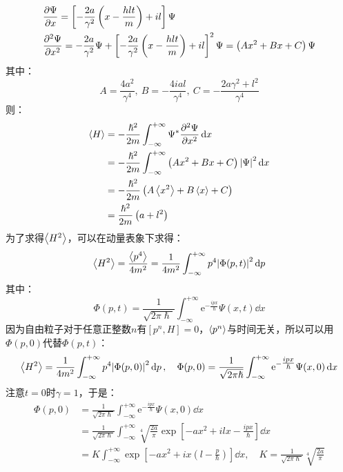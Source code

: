 \documentclass[a4paper,fontset=none]{ctexart}
\renewcommand\hbar\hslash
\begin{document}
\begin{itemize}
        \begin{align*}
            & \pdv{\Psi}{x}
            = \left[-\frac{2a}{\gamma^2}\left(x - \frac{hlt}{m}\right) + il\right]\Psi \\
            & \pdv[2]{\Psi}{x}
            = -\frac{2a}{\gamma^2}\Psi + \left[-\frac{2a}{\gamma^2}\left(x - \frac{hlt}{m}\right) + il\right]^2\Psi
            = \left(Ax^2 + Bx + C\right)\Psi
        \end{align*}
        其中：
        \[
            A = \frac{4a^2}{\gamma^4},\ B = -\frac{4ial}{\gamma^4},\ C = -\frac{2a\gamma^2 + l^2}{\gamma^4}
        \]
        则：
        \begin{align*}
            \expval{H}
            &= -\frac{\hbar^2}{2m} \int_{-\infty}^{+\infty} \Psi^* \pdv[2]{\Psi}{x} \dd{x} \\
            &= -\frac{\hbar^2}{2m} \int_{-\infty}^{+\infty} \left(Ax^2 + Bx + C\right)\abs{\Psi}^2 \dd{x} \\
            &= -\frac{\hbar^2}{2m} \left(A\expval{x^2} + B\expval{x} + C\right) \\
            &= \frac{\hbar^2}{2m} \left(a + l^2\right)
        \end{align*}
        为了求得$\expval{H^2}$，可以在动量表象下求得：
        \[
            \expval{H^2} = \frac{\expval{p^4}}{4m^2} = \frac{1}{4m^2} \int_{-\infty}^{+\infty} p^4 \abs{\Phi(p,t)}^2 \dd{p}
        \]
        其中：
        \[
            \Phi(p,t) = \frac{1}{\sqrt{2\pi\hbar}} \int_{-\infty}^{+\infty} \mathrm{e}^{-\tfrac{ipx}{\hbar}} \Psi(x,t) \dd{x}
        \]
        因为自由粒子对于任意正整数$n$有$[p^n, H] = 0$，$\expval{p^n}$与时间无关，所以可以用$\Phi(p,0)$代替$\Phi(p,t)$：
        \[
            \expval{H^2} = \frac{1}{4m^2} \int_{-\infty}^{+\infty} p^4 \abs{\Phi(p,0)}^2 \dd{p},\quad
            \Phi(p,0) = \frac{1}{\sqrt{2\pi\hbar}} \int_{-\infty}^{+\infty} \mathrm{e}^{-\tfrac{ipx}{\hbar}} \Psi(x,0) \dd{x}
        \]
        注意$t = 0$时$\gamma = 1$，于是：
        \begin{align*}
            \Phi(p,0)
            &= \frac{1}{\sqrt{2\pi\hbar}} \int_{-\infty}^{+\infty} \mathrm{e}^{-\tfrac{ipx}{\hbar}} \Psi(x,0) \dd{x} \\
            &= \frac{1}{\sqrt{2\pi\hbar}} \int_{-\infty}^{+\infty} \sqrt[4]{\frac{2a}{\pi}} \exp[-ax^2 + ilx - \frac{ipx}{\hbar}] \dd{x} \\
            &= K \int_{-\infty}^{+\infty} \exp[-ax^2 + ix \left(l - \frac{p}{\hbar}\right)] \dd{x},\quad K = \frac{1}{\sqrt{2\pi\hbar}} \sqrt[4]{\frac{2a}{\pi}}

\end{align*}
\end{itemize}
\end{document}
